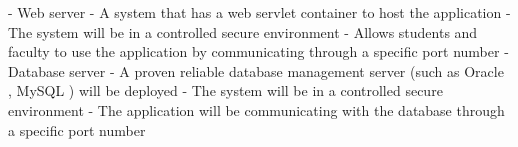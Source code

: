 - Web server 	
  - A system that has a web servlet container to host the application
  - The system will be in a controlled secure environment 
  - Allows students and faculty to use the application by communicating through a specific port number
- Database server 
  - A proven reliable database management server (such as Oracle , MySQL ) will be deployed 
  - The system will be in a controlled secure environment 
  - The application will be communicating with the database through a specific port number
